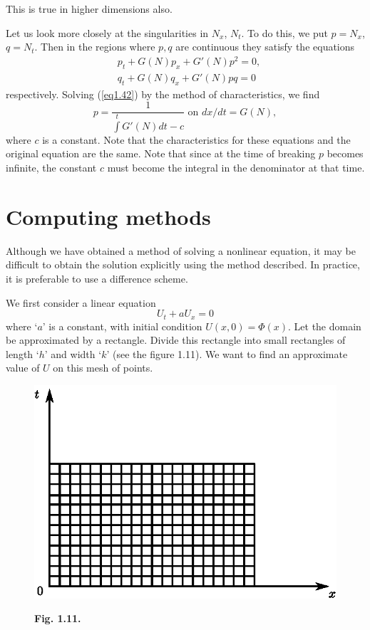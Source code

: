 \begin{note*}
This is true in higher dimensions also. 
\end{note*}

Let us look more closely at the singularities in $N_x$, $N_t$. To do this, we put $p = N_x$, $q = N_t$. Then in the regions where $p,q$ are continuous they satisfy the equations 
\begin{align*}
& p_t + G(N) p_x + G' (N) p^2 = 0, \tag{1.42}\label{eq1.42}\\
& q_t + G(N) q_x + G' (N) pq = 0 \tag{1.43}\label{eq1.43}
\end{align*}\pageoriginale
respectively. Solving (\ref{eq1.42}) by the method of characteristics, we find 
$$
p = \frac{1}{\int\limits^t G'(N)dt - c} \text{ on } dx / dt = G(N),
$$
where $c$ is a constant. Note that the characteristics for these equations and the original equation are the same. Note that since at the time of breaking $p$ becomes infinite, the constant $c$ must become the integral in the denominator at that time. 

\section{Computing methods}\label{chap1:sec1.7}
Although we have obtained a method of solving a nonlinear equation, it may be difficult to obtain the solution  explicitly using the method described. In practice, it is preferable to use a difference scheme.

We first consider a linear equation
$$
U_t + a U_x = 0
$$
where `$a$' is a constant, with initial condition $U(x,0) = \Phi (x)$. Let the domain be approximated by a rectangle. Divide this rectangle into small rectangles of length `$h$' and width `$k$' (see the figure 1.11). We want to find an approximate value of $U$ on this mesh of points. 
\begin{figure}[H]
\centering
\includegraphics{figures/fig1.11.eps}
\centerline{\bf Fig. 1.11.}
\end{figure}\pageoriginale

